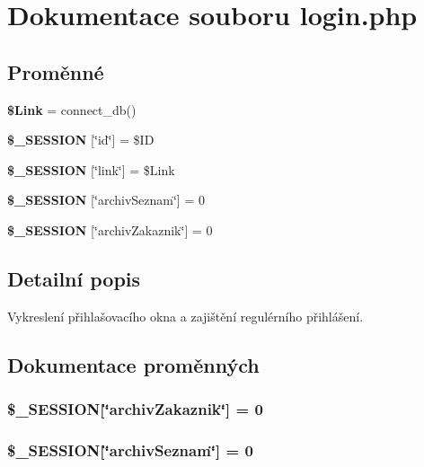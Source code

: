 \section{Dokumentace souboru login.php}
\label{login_8php}
\subsection*{Proměnné}
\begin{CompactItemize}
\item 
{\bf \$Link} = connect\_\-db()
\item 
{\bf \$\_\-SESSION} [\char`\"{}id\char`\"{}] = \$ID
\item 
{\bf \$\_\-SESSION} [\char`\"{}link\char`\"{}] = \$Link
\item 
{\bf \$\_\-SESSION} [\char`\"{}archivSeznam\char`\"{}] = 0
\item 
{\bf \$\_\-SESSION} [\char`\"{}archivZakaznik\char`\"{}] = 0
\end{CompactItemize}


\subsection{Detailní popis}
Vykreslení přihlašovacího okna a zajištění regulérního přihlášení. 

\subsection{Dokumentace proměnných}
\subsubsection{\setlength{\rightskip}{0pt plus 5cm}\$\_\-SESSION[\char`\"{}archivZakaznik\char`\"{}] = 0}\label{login_8php_5f8e28fc5d517864ebe89bfdf5584455}


\subsubsection{\setlength{\rightskip}{0pt plus 5cm}\$\_\-SESSION[\char`\"{}archivSeznam\char`\"{}] = 0}\label{login_8php_6d997eadf260b060c3be51ea759bdea8}


